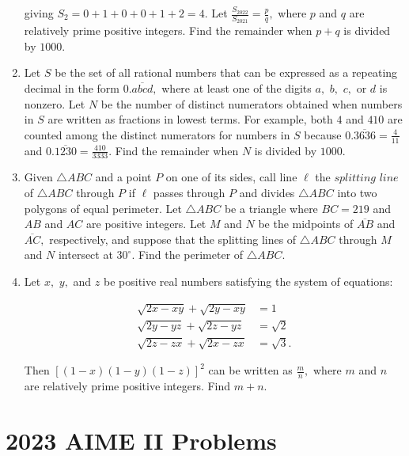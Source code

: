 \documentclass{article}
\begin{document}
\begin{enumerate}[label=\arabic*., itemsep=0.5em]
 giving \(S_2 = 0+1+0+0+1+2=4.\) Let \(\frac{S_{2022}}{S_{2021}} = \frac{p}{q},\) where \(p\) and \(q\) are relatively prime positive integers. Find the remainder when \(p+q\) is divided by \(1000.\)\par \vspace{0.5em}\item Let \(S\) be the set of all rational numbers that can be expressed as a repeating decimal in the form \(0.\overline{abcd},\) where at least one of the digits \(a,\) \(b,\) \(c,\) or \(d\) is nonzero. Let \(N\) be the number of distinct numerators obtained when numbers in \(S\) are written as fractions in lowest terms. For example, both \(4\) and \(410\) are counted among the distinct numerators for numbers in \(S\) because \(0.\overline{3636} = \frac{4}{11}\) and \(0.\overline{1230} = \frac{410}{3333}.\) Find the remainder when \(N\) is divided by \(1000.\)\par \vspace{0.5em}\item Given \(\triangle ABC\) and a point \(P\) on one of its sides, call line \(\ell\) the \(\textit{splitting line}\) of \(\triangle ABC\) through \(P\) if \(\ell\) passes through \(P\) and divides \(\triangle ABC\) into two polygons of equal perimeter. Let \(\triangle ABC\) be a triangle where \(BC = 219\) and \(AB\) and \(AC\) are positive integers. Let \(M\) and \(N\) be the midpoints of \(\overline{AB}\) and \(\overline{AC},\) respectively, and suppose that the splitting lines of \(\triangle ABC\) through \(M\) and \(N\) intersect at \(30^\circ.\) Find the perimeter of \(\triangle ABC.\)\par \vspace{0.5em}\item Let \(x,\) \(y,\) and \(z\) be positive real numbers satisfying the system of equations:

\begin{align*}
\sqrt{2x-xy} + \sqrt{2y-xy} &= 1 \\
\sqrt{2y-yz} + \sqrt{2z-yz} &= \sqrt2 \\
\sqrt{2z-zx} + \sqrt{2x-zx} &= \sqrt3.
\end{align*}
 
Then \(\left[ (1-x)(1-y)(1-z) \right]^2\) can be written as \(\frac{m}{n},\) where \(m\) and \(n\) are relatively prime positive integers. Find \(m+n.\)\par \vspace{0.5em}
\end{enumerate}
\newpage\section*{2023 AIME II Problems}
\end{document}
